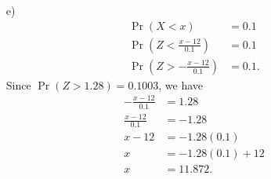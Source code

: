 \documentclass[12pt]{article}
\begin{document}
{\begin{minipage}[t]{0.98\textwidth}
\begin{minipage}[t]{0.47\textwidth}
\begin{enumerate}[a)]
\begin{align*}
\Pr(Z > \tfrac{x-12}{0.1}) &= 0.1.
\end{align*}
From the tables we see $\Pr(Z > 1.28) = 0.1003$.
\begin{align*}
\Rightarrow \tfrac{x-12}{0.1} &= 1.28 \\
x-12 &= 1.28(0.1) \\
x &= 1.28(0.1) + 12\\
x &= 12.128.
\end{align*}
\item[e)] \quad \\[-1.45cm]
\begin{align*}
\Pr(X < x) &= 0.1 \\
\Pr(Z < \tfrac{x-12}{0.1}) &= 0.1 \\
\Pr(Z > - \tfrac{x-12}{0.1}) &= 0.1.
\end{align*}
Since $\Pr(Z > 1.28) = 0.1003$, we have
\begin{align*}
-\tfrac{x-12}{0.1} &= 1.28 \\
\tfrac{x-12}{0.1} &= -1.28 \\
x-12 &= -1.28(0.1) \\
x &= -1.28(0.1) + 12\\
x &=  11.872.
\end{align*}
\end{enumerate}
\end{minipage}
\end{minipage}}\vspace{0.03\textwidth}
\end{document}
